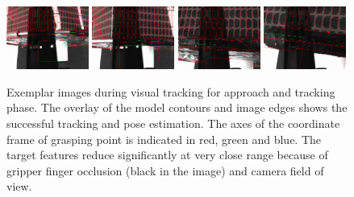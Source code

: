 

%
\begin{figure}
\centering\includegraphics[angle=0,width=0.24\textwidth]{./figures/frame0786_result_cam0}
\centering\includegraphics[angle=0,width=0.24\textwidth]{./figures/frame0849_result_cam0}
\centering\includegraphics[angle=0,width=0.24\textwidth]{./figures/frame0922_result_cam0}
\centering\includegraphics[angle=0,width=0.24\textwidth]{./figures/frame0954_result_cam0}
\caption{Exemplar images during visual tracking for approach and tracking phase. The overlay of the model contours and image edges shows the successful tracking and pose estimation. The axes of the coordinate frame of grasping point is indicated in red, green and blue. The target features reduce significantly at very close range because of gripper finger occlusion (black in the image) and camera field of view.}
\label{fig:TrackingImages}
\end{figure}


